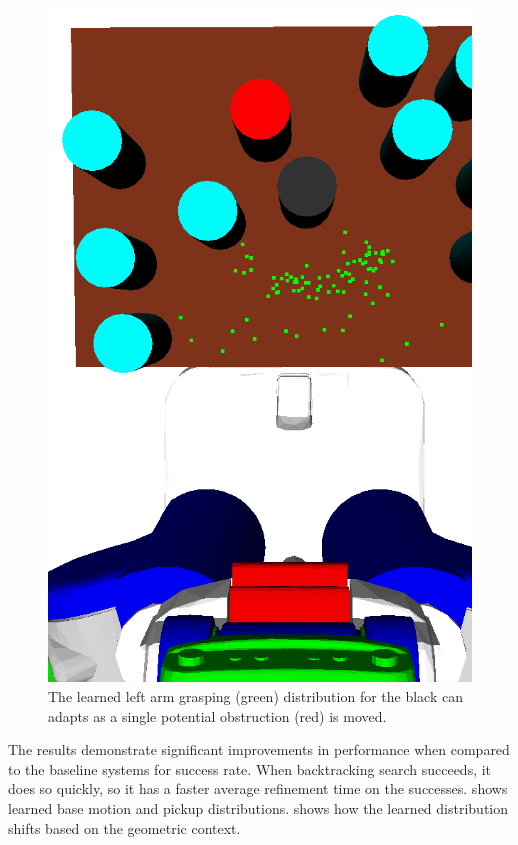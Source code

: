 \begin{figure}[t]
    \includegraphics[scale=0.13]{images/grasp_context_3.png}
  \caption{\small{The learned left arm grasping (green) distribution
      for the black can adapts as a single potential obstruction (red) is
      moved.}}
  \label{fig:context}
\end{figure}

The results demonstrate significant improvements in performance when
compared to the baseline systems for success rate. When backtracking
search succeeds, it does so quickly, so it has a faster average
refinement time on the successes.  shows learned
base motion and pickup distributions.  shows how
the learned distribution shifts based on the geometric context.

